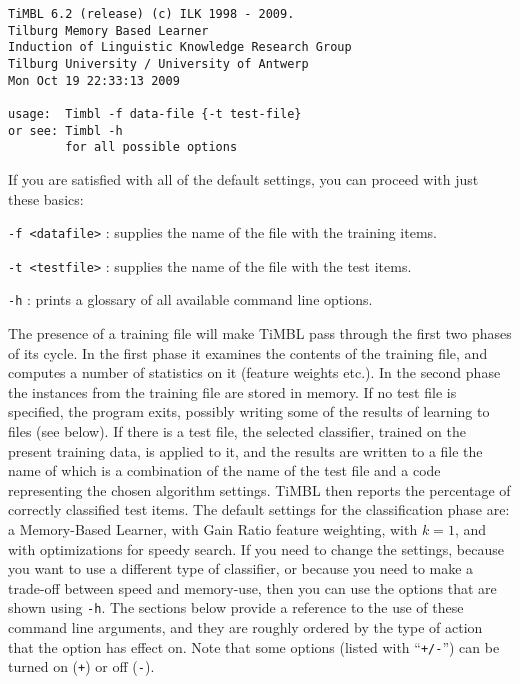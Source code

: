 \documentclass{report}
\begin{document}
{\footnotesize
\begin{verbatim}
TiMBL 6.2 (release) (c) ILK 1998 - 2009.
Tilburg Memory Based Learner
Induction of Linguistic Knowledge Research Group
Tilburg University / University of Antwerp
Mon Oct 19 22:33:13 2009

usage:  Timbl -f data-file {-t test-file}
or see: Timbl -h
        for all possible options
\end{verbatim}
}

If you are satisfied with all of the default settings, you can proceed
with just these basics:

\begin{description}

\item {\tt -f <datafile>} : supplies the name of the file with the
training items.
\item {\tt -t <testfile>} : supplies the name of the file with the
test items.
\item {\tt -h} : prints a glossary of all available command line 
options.

\end{description}

The presence of a training file will make TiMBL pass through the first two phases of its cycle. In the first phase it examines the contents of the training file, and computes a number of statistics on it (feature weights etc.). In the second phase the instances from the training file are stored in memory. If no test file is specified, the program exits, possibly writing some of the results of learning to files (see below). If there is a test file, the selected classifier, trained on the present training data, is applied to it, and the results are written to a file the name of which is a combination of the name of the test file and a code representing the chosen algorithm settings. TiMBL then reports the percentage of correctly classified test items. The default settings for the classification phase are: a Memory-Based Learner, with Gain Ratio feature weighting, with $k=1$, and with optimizations for speedy search. If you need to change the settings, because you want to use a different type of classifier, or because you need to make a trade-off between speed and memory-use, then you can use the options that are shown using {\tt -h}. The sections below provide a reference to the use of these command line arguments, and they are roughly ordered by the type of action that the option has effect on. Note that some options (listed with ``{\tt +/-}'') can be turned on ({\tt +}) or off ({\tt -}).
\end{document}
